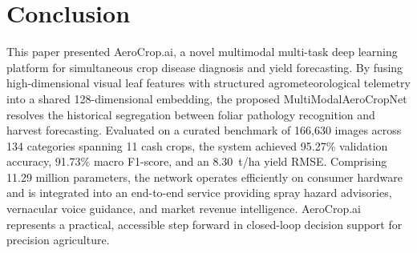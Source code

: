 \documentclass[conference]{IEEEtran}
\begin{document}
\section{Conclusion}

This paper presented AeroCrop.ai, a novel multimodal multi-task deep learning platform for simultaneous crop disease diagnosis and yield forecasting. By fusing high-dimensional visual leaf features with structured agrometeorological telemetry into a shared 128-dimensional embedding, the proposed MultiModalAeroCropNet resolves the historical segregation between foliar pathology recognition and harvest forecasting. Evaluated on a curated benchmark of 166,630 images across 134 categories spanning 11 cash crops, the system achieved 95.27\% validation accuracy, 91.73\% macro F1-score, and an 8.30~t/ha yield RMSE. Comprising 11.29 million parameters, the network operates efficiently on consumer hardware and is integrated into an end-to-end service providing spray hazard advisories, vernacular voice guidance, and market revenue intelligence. AeroCrop.ai represents a practical, accessible step forward in closed-loop decision support for precision agriculture.
\end{document}
